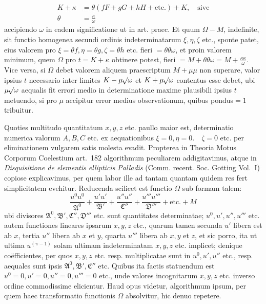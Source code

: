 \[
\begin{aligned}
K+\kappa&=\theta(fF+gG+hH+\text{etc.})+K,\quad\text{sive}\\[3pt]
\theta&=\frac{\kappa}{\omega}
\end{aligned}
\]
accipiendo \(\omega\) in eadem significatione ut in art. praec. Et quum \(\Omega-M\), indefinite, sit functio homogenea secundi ordinis indeterminatarum \(\xi,\eta,\zeta\) etc., sponte patet, eius valorem pro \(\xi=\theta f,\allowbreak\eta=\theta g,\allowbreak\zeta=\theta h\) etc. fieri \(=\theta\theta\omega\), et proin valorem minimum, quem \(\Omega\) pro \(t=K+\kappa\) obtinere potest, fieri \(=M+\theta\theta\omega=M+\frac{\kappa\kappa}{\omega}\). Vice versa, si \(\Omega\) debet valorem aliquem praescriptum \(M+\mu\mu\) non superare, valor ipsius \(t\) necessario inter limites \(K-\mu\mathord{{}^{}\!\surd}\omega\) et \(K+\mu\mathord{{}^{}\!\surd}\omega\) contentus esse debet, ubi \(\mu\mathord{{}^{}\!\surd}\omega\) aequalis fit errori medio in determinatione maxime plausibili ipsius \(t\) metuendo, si pro \(\mu\) accipitur error medius observationum, quibus pondus\(=1\) tribuitur.

Quoties multitudo quantitatum \(x,y,z\) etc. paullo maior est, determinatio numerica valorum \(A,B,C\) etc. ex aequationibus \(\xi=0,\allowbreak\eta=0.\quad\zeta=0\) etc. per eliminationem vulgarem satis molesta evadit. Propterea in Theoria Motus Corporum Coelestium art.\ 182 algorithmum peculiarem addigitavimus, atque in \textit{Disquisitione de elementis ellipticis Palladis} (Comm. recent. Soc. Gotting Vol.\ I) copiose explicavimus, per quem labor ille ad tantam quantam quidem res fert simplicitatem evehitur. Reducenda scilicet est functio \(\Omega\) sub formam talem:
\[
\frac{u^0u^0}{\mathfrak{A}^0}+\frac{u'u'}{\mathfrak{B}'}+\frac{u''u''}{\mathfrak{C}''}+\frac{u'''u'''}{\mathfrak{D}'''}+\text{etc.}+M
\]
ubi divisores \(\mathfrak{A}^0,\mathfrak{B}',\mathfrak{C}'',\mathfrak{D}'''\) etc. sunt quantitates determinatae; \(u^0,u',u'',u'''\) etc. autem functiones lineares ipsarum \(x,y,z\) etc., quarum tamen secunda \(u'\) libera est ab \(x\), tertia \(u''\) libera ab \(x\) et \(y\), quarta \(u'''\) libera ab \(x,y\) et \(z\), et sic porro, ita ut ultima \(u^{(\pi-1)}\) solam ultimam indeterminatam \(x,y,z\) etc. implicet; denique coëfficientes, per quos \(x,y,z\) etc. resp. multiplicatae sunt in \(u^0,u',u''\) etc., resp. aequales sunt ipsis \(\mathfrak{A}^0,\mathfrak{B}',\mathfrak{C}''\) etc. Quibus ita factis statuendum est \(u^0=0,\allowbreak u'=0,\allowbreak u''=0,\allowbreak u'''=0\) etc., unde valores incognitarum \(x,y,z\) etc. inverso ordine commodissime elicientur. Haud opus videtur, algorithmum ipsum, per quem haec transformatio functionis \(\Omega\) absolvitur, hic denuo repetere.

